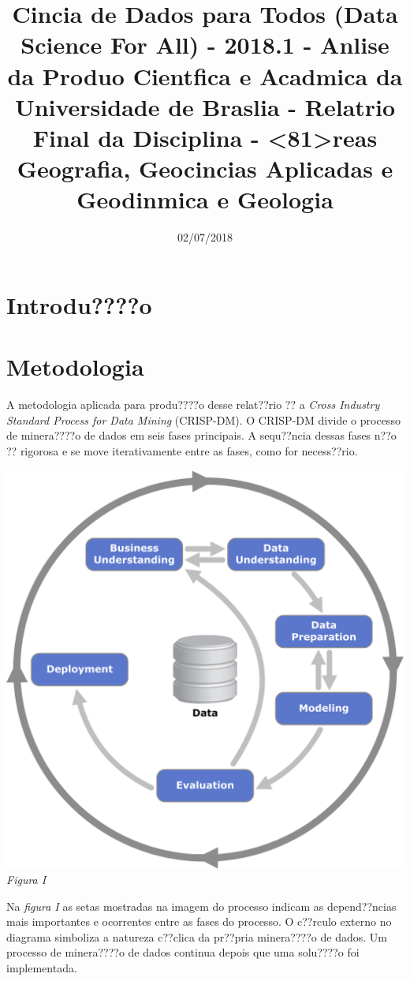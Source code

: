 \documentclass[]{article}
\title{Cincia de Dados para Todos (Data Science For All) - 2018.1 - Anlise da
Produo Cientfica e Acadmica da Universidade de Braslia - Relatrio Final
da Disciplina - \textless{}81\textgreater{}reas Geografia, Geocincias
Aplicadas e Geodinmica e Geologia}
\author{}
\date{02/07/2018}
\begin{document}
\maketitle

\section{Introdu????o}\label{introduo}

\section{Metodologia}\label{metodologia}

A metodologia aplicada para produ????o desse relat??rio ?? a \emph{Cross
Industry Standard Process for Data Mining} (CRISP-DM). O CRISP-DM divide
o processo de minera????o de dados em seis fases principais. A
sequ??ncia dessas fases n??o ?? rigorosa e se move iterativamente entre
as fases, como for necess??rio.

\includegraphics{images/CRISP-DM_Process_Diagram.png} \emph{Figura I}

Na \emph{figura I} as setas mostradas na imagem do processo indicam as
depend??ncias mais importantes e ocorrentes entre as fases do processo.
O c??rculo externo no diagrama simboliza a natureza c??clica da pr??pria
minera????o de dados. Um processo de minera????o de dados continua
depois que uma solu????o foi implementada.
\end{document}
